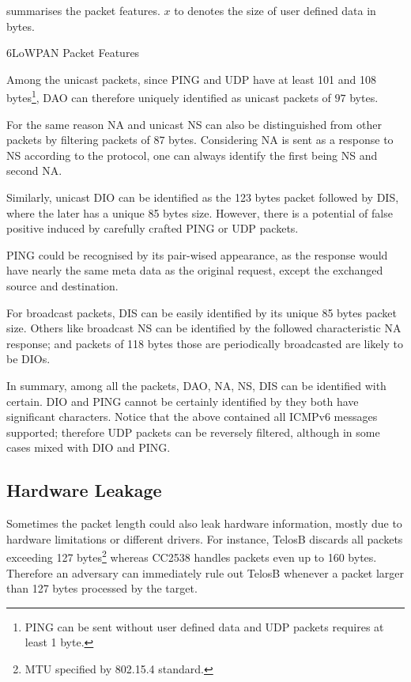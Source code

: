  summarises the packet features. $x$ to denotes the size of user defined data in bytes.

\begin{table}
	\center
	
	\caption{6LoWPAN Packet Features\label{IcmpPacketFeature}}
\end{table}


Among the unicast packets, since PING and UDP have at least 101 and 108 bytes\footnote{PING can be sent without user defined data and UDP packets requires at least 1 byte.}, DAO can therefore uniquely identified as unicast packets of $97$ bytes. 

For the same reason NA and unicast NS can also be distinguished from other packets by filtering packets of $87$ bytes. Considering NA is sent as a response to NS according to the protocol, one can always identify the first being NS and second NA. 

Similarly, unicast DIO can be identified as the 123 bytes packet followed by DIS, where the later has a unique 85 bytes size. However, there is a potential of false positive induced by carefully crafted PING or UDP packets.

PING could be recognised by its pair-wised appearance, as the response would have nearly the same meta data as the original request, except the exchanged source and destination.

For broadcast packets, DIS can be easily identified by its unique 85 bytes packet size. Others like broadcast NS can be identified by the followed characteristic NA response; and packets of 118 bytes those are periodically broadcasted are likely to be DIOs.

In summary, among all the packets, DAO, NA, NS, DIS can be identified with certain. DIO and PING cannot be certainly identified by they both have significant characters. Notice that the above contained all ICMPv6 messages supported; therefore UDP packets can be reversely filtered, although in some cases mixed with DIO and PING.


\subsection{Hardware Leakage}
Sometimes the packet length could also leak hardware information, mostly due to hardware limitations or different drivers. For instance, TelosB\cite{TelosB} discards all packets exceeding 127 bytes\footnote{MTU specified by 802.15.4 standard.} whereas CC2538 handles packets even up to 160 bytes. Therefore an adversary can immediately rule out TelosB whenever a packet larger than 127 bytes processed by the target.

